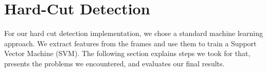 \section{Hard-Cut Detection}
\label{sec:hard_cut}

For our hard cut detection implementation, we chose a standard machine learning approach.
We extract features from the frames and use them to train a Support Vector Machine (SVM).
The following section explains steps we took for that, presents the problems we encountered, and evaluates our final results.




